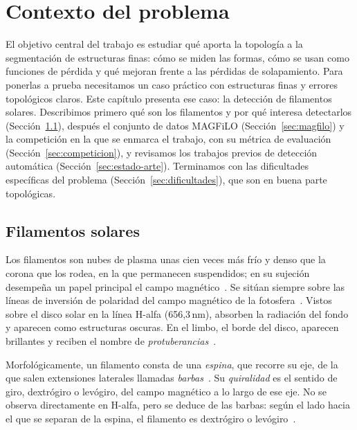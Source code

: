 
\chapter{Contexto del problema}
\label{cap:contexto}

El objetivo central del trabajo es estudiar qué aporta la topología a la
segmentación de estructuras finas: cómo se miden las formas, cómo se usan
como funciones de pérdida y qué mejoran frente a las pérdidas de
solapamiento. Para ponerlas a prueba necesitamos un caso práctico con
estructuras finas y errores topológicos claros. Este capítulo presenta ese
caso: la detección de filamentos solares. Describimos primero qué son los
filamentos y por qué interesa detectarlos (Sección~\ref{sec:filamentos}),
después el conjunto de datos MAGFiLO (Sección~\ref{sec:magfilo}) y la
competición en la que se enmarca el trabajo, con su métrica de evaluación
(Sección~\ref{sec:competicion}), y revisamos los trabajos previos de
detección automática (Sección~\ref{sec:estado-arte}). Terminamos con las
dificultades específicas del problema (Sección~\ref{sec:dificultades}), que
son en buena parte topológicas.

\section{Filamentos solares}
\label{sec:filamentos}

Los filamentos son nubes de plasma unas cien veces más frío y denso que la
corona que los rodea, en la que permanecen suspendidos; en su sujeción
desempeña un papel principal el campo magnético~\cite[§1.1]{parenti2014}.
Se sitúan siempre sobre las líneas de inversión de polaridad del campo
magnético de la fotosfera~\cite[§1, §2.1]{parenti2014}. Vistos sobre el
disco solar en la línea H-alfa (656,3\,nm), absorben la radiación del fondo
y aparecen como estructuras oscuras. En el limbo, el borde del disco, aparecen brillantes y
reciben el nombre de \emph{protuberancias}~\cite[§1]{parenti2014}.

Morfológicamente, un filamento consta de una \emph{espina}, que recorre su
eje, de la que salen extensiones laterales llamadas
\emph{barbas}~\cite[§2.1]{parenti2014}. Su \emph{quiralidad} es el
sentido de giro, dextrógiro o levógiro, del campo magnético a lo largo de
ese eje. No se observa directamente en H-alfa, pero se deduce de las
barbas: según el lado hacia el que se separan de la espina, el filamento
es dextrógiro o levógiro~\cite[§2.4.1]{parenti2014}.

